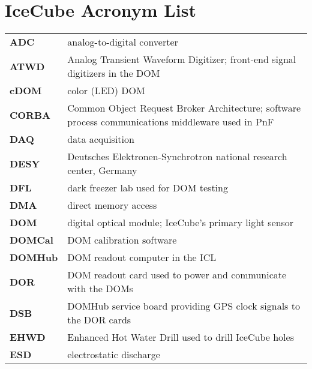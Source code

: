 
\section*{IceCube Acronym List}

\begin{longtable}{p{} p{}}

  \textbf{ADC} & analog-to-digital converter \\

  \textbf{ATWD} & Analog Transient Waveform Digitizer; front-end signal
  digitizers in the DOM \\

  \textbf{cDOM} & color (LED) DOM \\

  \textbf{CORBA} & Common Object Request Broker Architecture; software
  process communications middleware used in PnF \\
  
  \textbf{DAQ} & data acquisition \\

  \textbf{DESY} & Deutsches Elektronen-Synchrotron national research
  center, Germany \\
  
  \textbf{DFL} & dark freezer lab used for DOM testing \\

  \textbf{DMA} & direct memory access \\
  
  \textbf{DOM} & digital optical module; IceCube's primary light sensor \\

  \textbf{DOMCal} & DOM calibration software \\

  \textbf{DOMHub} & DOM readout computer in the ICL \\
  
  \textbf{DOR} & DOM readout card used to power and communicate with
  the DOMs \\

  \textbf{DSB} & DOMHub service board providing GPS clock signals to
  the DOR cards \\
  
  \textbf{EHWD} & Enhanced Hot Water Drill used to drill IceCube holes \\
  
  \textbf{ESD} & electrostatic discharge \\
  

\end{longtable}
